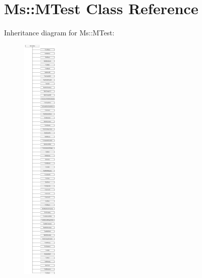 \hypertarget{class_ms_1_1_m_test}{}\section{Ms\+:\+:M\+Test Class Reference}
\label{class_ms_1_1_m_test}
Inheritance diagram for Ms\+:\+:M\+Test\+:\begin{figure}[H]
\begin{center}
\leavevmode
\includegraphics[height=12.000000cm]{class_ms_1_1_m_test}
\end{center}
\end{figure}
